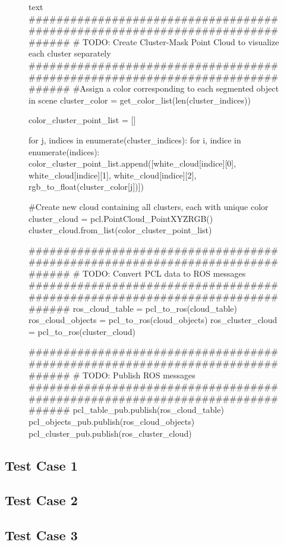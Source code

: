 \documentclass[a4paper]{article}
\begin{document}
\begin{figure}[]\scriptsize
\begin{sexylisting}{text}
##############################################################################
# TODO: Create Cluster-Mask Point Cloud to visualize each cluster separately
##############################################################################
    #Assign a color corresponding to each segmented object in scene
    cluster_color = get_color_list(len(cluster_indices))

    color_cluster_point_list = []

    for j, indices in enumerate(cluster_indices):
        for i, indice in enumerate(indices):
            color_cluster_point_list.append([white_cloud[indice][0],
                           white_cloud[indice][1],
                           white_cloud[indice][2],
                           rgb_to_float(cluster_color[j])])

    #Create new cloud containing all clusters, each with unique color
    cluster_cloud = pcl.PointCloud_PointXYZRGB()
    cluster_cloud.from_list(color_cluster_point_list)


##############################################################################
# TODO: Convert PCL data to ROS messages
##############################################################################
    ros_cloud_table = pcl_to_ros(cloud_table)
    ros_cloud_objects = pcl_to_ros(cloud_objects)
    ros_cluster_cloud = pcl_to_ros(cluster_cloud)


##############################################################################
# TODO: Publish ROS messages
##############################################################################
    pcl_table_pub.publish(ros_cloud_table)
    pcl_objects_pub.publish(ros_cloud_objects)
    pcl_cluster_pub.publish(ros_cluster_cloud)
\end{sexylisting}
\end{figure}

\subsection{Test Case 1}
\subsection{Test Case 2}
\subsection{Test Case 3}
\end{document}
